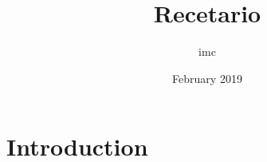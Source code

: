 \documentclass{article}
\title{Recetario}
\author{imc }
\date{February 2019}
\begin{document}
\maketitle

\section{Introduction}
\end{document}
